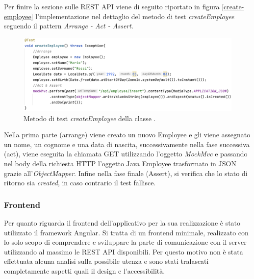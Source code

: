 Per finire la sezione sulle REST API viene di seguito riportato in figura \ref{create-employee} l'implementazione nel dettaglio del metodo di test \textit{createEmployee} seguendo il pattern \textit{Arrange - Act - Assert}.
\FloatBarrier
\begin{figure}[!ht]
\begin{mdframed}
\centering
\includegraphics[width=1\linewidth]{immagini/createEmployee.png}
\end{mdframed}
\caption{Metodo di test \textit{createEmployee} della classe .}
\label{employee-controller-test}
\end{figure}
\FloatBarrier
Nella prima parte (arrange) viene creato un nuovo Employee e gli viene assegnato un nome, un cognome e una data di nascita, successivamente nella fase successiva (act), viene eseguita la chiamata GET utilizzando l'oggetto \textit{MockMvc} e passando nel body della richiesta HTTP l'oggetto Java Employee trasformato in JSON grazie all'\textit{ObjectMapper}. Infine nella fase finale (Assert), si verifica che lo stato di ritorno sia \textit{created}, in caso contrario il test fallisce.
\subsubsection*{Frontend}
Per quanto riguarda il frontend dell'applicativo per la sua realizzazione è stato utilizzato il framework Angular. Si tratta di un frontend minimale, realizzato con lo solo scopo di comprendere e sviluppare la parte di comunicazione con il server utilizzando al massimo le REST API disponibili. Per questo motivo non è stata effettuata alcuna analisi sulla possibile utenza e sono stati tralascati completamente aspetti quali il design e l'accessibilità.\\






